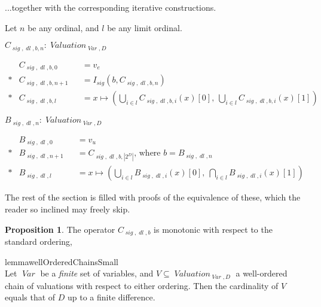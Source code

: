 \documentclass[oneside,12pt]{book}
\theoremstyle{definition}
\newtheorem{proposition}[theorem]{Proposition}
\theoremstyle{remark}
\newcommand\var[1]{\mathop{\mathit{#1}}\nolimits}
\newcommand{\sig}{\var{sig}}
\newcommand{\Var}{\var{Var}}
\newcommand{\Valuation}{\var{Valuation}}
\newcommand{\dl}{\var{dl}}
\begin{document}
...together with the corresponding iterative constructions.

\begin{defBox}
  Let $n$ be any ordinal, and $l$ be any limit ordinal.
  
  \medskip \noindent $C_{\sig,\dl,b,n}\colon \Valuation_{\Var,D}$
  
  \nopagebreak \medskip \noindent
  $\begin{aligned}
    & C_{\sig,\dl,b,0} & &= v_e \\*
    & C_{\sig,\dl,b,n+1} & &= I_{\sig}(b, C_{\sig,\dl,b,n}) \\*
    & C_{\sig,\dl,b,l} & &= x \mapsto (\bigcup_{i \in l}C_{\sig,\dl,b,i}(x)[0],
      \ \bigcup_{i \in l}C_{\sig,\dl,b,i}(x)[1])
  \end{aligned}$
  
  \medskip \noindent $B_{\sig,\dl,n}\colon \Valuation_{\Var,D}$
  
  \nopagebreak \medskip \noindent
  $\begin{aligned}
    & B_{\sig,\dl,0} & &= v_u \\*
    & B_{\sig,\dl,n+1} & &= C_{\sig,\dl,b,|2^D|} \text{, where } b = B_{\sig,\dl,n} \\*
    & B_{\sig,\dl,l} & &= x \mapsto (\bigcup_{i \in l}B_{\sig,\dl,i}(x)[0],
      \ \bigcap_{i \in l}B_{\sig,\dl,i}(x)[1])
  \end{aligned}$
  
\end{defBox}

The rest of the section is filled with proofs of the equivalence of these,
which the reader so inclined may freely skip.

\begin{proposition}
  The operator $C_{\sig,\dl,b}$ is monotonic with respect to the standard ordering,
\end{proposition}

\begin{restatable}%
{lemma}{wellOrderedChainsSmall} \label{wellOrderedChainsSmall} \hfill \\
  Let $\Var$ be a \textit{finite} set of variables, and
  $V \subseteq \Valuation_{\Var,D}$ a well-ordered chain of valuations with
  respect to either ordering. Then the cardinality of $V$ equals that of $D$
  up to a finite difference.
\end{restatable}
\end{document}
